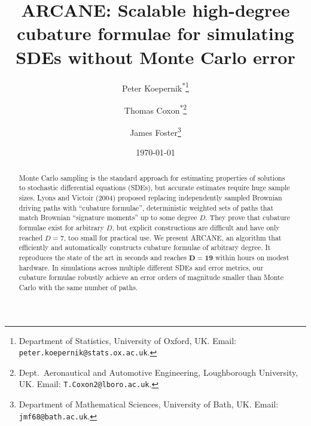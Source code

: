 \documentclass[11pt, letterpaper]{article}
\theoremstyle{definition}
\theoremstyle{remark}
\newcommand{\short}{ARCANE\xspace}
\begin{document}
\title{\short: Scalable high-degree cubature formulae for simulating SDEs without Monte Carlo error}

\author{
  Peter Koepernik\textsuperscript{*}\thanks{Department of Statistics, University of Oxford, UK. Email: \texttt{peter.koepernik@stats.ox.ac.uk}.} \and
  Thomas Coxon\textsuperscript{*}\thanks{Dept.~Aeronautical and Automotive Engineering, Loughborough University, UK. Email: \texttt{T.Coxon2@lboro.ac.uk}.} \and
  James Foster\thanks{Department of Mathematical Sciences, University of Bath, UK. Email: \texttt{jmf68@bath.ac.uk}.}
}

\date{\today}

\makeatletter
\let\old@fnsymbol\@fnsymbol
\renewcommand{\@fnsymbol}[1]{\@arabic{#1}}
\makeatother

\maketitle

\makeatletter
\let\@fnsymbol\old@fnsymbol
\makeatother

\begingroup
\renewcommand{\thefootnote}{\fnsymbol{footnote}}
\endgroup

\begin{abstract}
Monte Carlo sampling is the standard approach for estimating properties of solutions to stochastic differential equations (SDEs), but accurate estimates require huge sample sizes. Lyons and Victoir (2004) proposed replacing independently sampled Brownian driving paths with ``cubature formulae'', deterministic weighted sets of paths that match Brownian ``signature moments'' up to some degree $D$. They prove that cubature formulae exist for arbitrary $D$, but explicit constructions are difficult and have only reached $D=7$, too small for practical use. We present ARCANE, an algorithm that efficiently and automatically constructs cubature formulae of arbitrary degree. It reproduces the state of the art in seconds and reaches $\boldsymbol{D=19}$ within hours on modest hardware. In simulations across multiple different SDEs and error metrics, our cubature formulae robustly achieve an error orders of magnitude smaller than Monte Carlo with the same number of paths.
\end{abstract}
\end{document}
